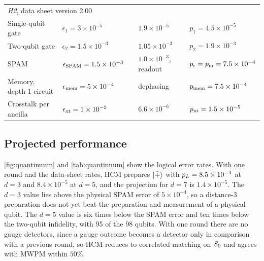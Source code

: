 \begin{table}[t]
\begin{ruledtabular}
\begin{tabular}{lllll}
    \hline
    \multicolumn{5}{l}{\emph{H2}, data sheet version 2.00~\cite{h2_datasheet}} \\
    Single-qubit gate & $\epsilon_1=3\times10^{-5}$ &  & $1.9\times10^{-5}$ & $p_1=4.5\times10^{-5}$ \\
    Two-qubit gate & $\epsilon_2=1.5\times10^{-3}$ &  & $1.05\times10^{-3}$ & $p_2=1.9\times10^{-3}$ \\
    SPAM & $\epsilon_{\rm SPAM}=1.5\times10^{-3}$ &  & $1.0\times10^{-3}$, readout & $p_{\rm r}=p_{\rm m}=7.5\times10^{-4}$ \\
    Memory, depth-1 circuit & $\epsilon_{\rm mem}=5\times10^{-4}$ &  & dephasing & $p_{\rm mem}=7.5\times10^{-4}$ \\
    Crosstalk per ancilla & $\epsilon_{\rm xt}=1\times10^{-5}$ &  & $6.6\times10^{-6}$ & $p_{\rm xt}=1.5\times10^{-5}$ \\
  \end{tabular}
  \end{ruledtabular}
\end{table}

\subsection{Projected performance}

\autoref{fig:quantinuum} and \autoref{tab:quantinuum} show the logical error rates. With one round and the data-sheet rates, HCM prepares $\left|\bar{+}\right\rangle$ with $p_L=8.5\times10^{-4}$ at $d=3$ and $8.4\times10^{-5}$ at $d=5$, and the projection for $d=7$ is $1.4\times10^{-5}$. The $d=3$ value lies above the physical SPAM error of $5\times10^{-4}$, so a distance-3 preparation does not yet beat the preparation and measurement of a physical qubit. The $d=5$ value is six times below the SPAM error and ten times below the two-qubit infidelity, with 95 of the 98 qubits. With one round there are no gauge detectors, since a gauge outcome becomes a detector only in comparison with a previous round, so HCM reduces to correlated matching on $S_0$ and agrees with MWPM within $50\%$.

